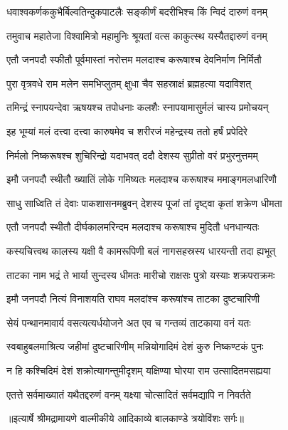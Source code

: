 \twolineshloka
{धवाश्वकर्णककुभैर्बिल्वतिन्दुकपाटलैः}
{सङ्कीर्णं बदरीभिश्च किं न्विदं दारुणं वनम्} %

\twolineshloka
{तमुवाच महातेजा विश्वामित्रो महामुनिः}
{श्रूयतां वत्स काकुत्स्थ यस्यैतद्दारुणं वनम्} %

\twolineshloka
{एतौ जनपदौ स्फीतौ पूर्वमास्तां नरोत्तम}
{मलदाश्च करूषाश्च देवनिर्माण निर्मितौ} %

\twolineshloka
{पुरा वृत्रवधे राम मलेन समभिप्लुतम्}
{क्षुधा चैव सहस्राक्षं ब्रह्महत्या यदाविशत्} %

\twolineshloka
{तमिन्द्रं स्नापयन्देवा ऋषयश्च तपोधनाः}
{कलशैः स्नापयामासुर्मलं चास्य प्रमोचयन्} %

\twolineshloka
{इह भूम्यां मलं दत्त्वा दत्त्वा कारुषमेव च}
{शरीरजं महेन्द्रस्य ततो हर्षं प्रपेदिरे} %

\twolineshloka
{निर्मलो निष्करूषश्च शुचिरिन्द्रो यदाभवत्}
{ददौ देशस्य सुप्रीतो वरं प्रभुरनुत्तमम्} %

\twolineshloka
{इमौ जनपदौ स्थीतौ ख्यातिं लोके गमिष्यतः}
{मलदाश्च करूषाश्च ममाङ्गमलधारिणौ} %

\twolineshloka
{साधु साध्विति तं देवाः पाकशासनमब्रुवन्}
{देशस्य पूजां तां दृष्ट्वा कृतां शक्रेण धीमता} %

\twolineshloka
{एतौ जनपदौ स्थीतौ दीर्घकालमरिन्दम}
{मलदाश्च करूषाश्च मुदितौ धनधान्यतः} %

\twolineshloka
{कस्यचित्त्वथ कालस्य यक्षी वै कामरूपिणी}
{बलं नागसहस्रस्य धारयन्ती तदा ह्यभूत्} %

\twolineshloka
{ताटका नाम भद्रं ते भार्या सुन्दस्य धीमतः}
{मारीचो राक्षसः पुत्रो यस्याः शक्रपराक्रमः} %

\twolineshloka
{इमौ जनपदौ नित्यं विनाशयति राघव}
{मलदांश्च करूषांश्च ताटका दुष्टचारिणी} %

\twolineshloka
{सेयं पन्थानमावार्य वसत्यत्यर्धयोजने}
{अत एव च गन्तव्यं ताटकाया वनं यतः} %

\twolineshloka
{स्वबाहुबलमाश्रित्य जहीमां दुष्टचारिणीम्}
{मन्नियोगादिमं देशं कुरु निष्कण्टकं पुनः} %

\twolineshloka
{न हि कश्चिदिमं देशं शक्रोत्यागन्तुमीदृशम्}
{यक्षिण्या घोरया राम उत्सादितमसह्यया} %

\twolineshloka
{एतत्ते सर्वमाख्यातं यथैतद्दरुणं वनम्}
{यक्ष्या चोत्सादितं सर्वमद्यापि न निवर्तते} %


{॥इत्यार्षे श्रीमद्रामायणे वाल्मीकीये आदिकाव्ये बालकाण्डे त्रयोविंशः सर्गः॥}

